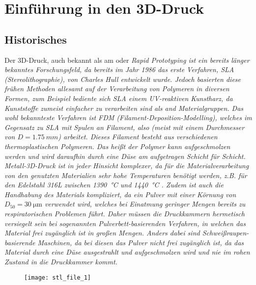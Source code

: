 \documentclass[../main.tex]{subfiles}
\begin{document}
\section{Einführung in den 3D-Druck}
\subsection{Historisches}
Der 3D-Druck, auch bekannt als \acrfull{am} oder \it{Rapid Prototyping} ist ein bereits länger bekanntes Forschungsfeld, da bereits im Jahr 1986 das erste Verfahren, SLA (Stereolithographie), von Charles Hull entwickelt wurde. 
Jedoch basierten diese frühen Methoden allesamt auf der Verarbeitung von Polymeren in diversen Formen, zum Beispiel bediente sich SLA einem UV-reaktiven Kunstharz, da Kunststoffe zumeist einfacher zu verarbeiten sind als and Materialgruppen. 
Das wohl bekannteste Verfahren ist FDM (\it{Filament-Deposition-Modelling}), welches im Gegensatz zu SLA mit Spulen an Filament, also  (meist mit einem Durchmesser von $D=\qty{1.75}{mm}$) arbeitet. 
Dieses Filament besteht aus verschiedenen thermoplastischen Polymeren. Das heißt der Polymer kann aufgeschmolzen werden und wird daraufhin durch eine Düse am  aufgetragen Schicht für Schicht.
Metall-3D-Druck ist in jeder Hinsicht komplexer, da für die Materialverarbeitung von den genutzten Materialien sehr hohe Temperaturen benötigt werden, z.B. für den Edelstahl 316L zwischen \qty{1390}{\celsius} und \qty{1440}{\degreeCelsius} \parencite{610LSTEEL}. Zudem ist auch die Handhabung des Materials kompliziert, da ein Pulver mit einer Körnung von $D_{50}=\SI{30}{\micro\meter}$\parencite[~S.3]{ZAKRZEWSKI2020115} verwendet wird, welches bei Einatmung geringer Mengen bereits zu respiratorischen Problemen führt.
Daher müssen die Druckkammern hermetisch versiegelt sein bei sogenannten Pulverbett-basierenden Verfahren, in welchen das Material frei zugänglich ist in großen Mengen.
Anders dabei sind Schweißraupen-basierende Maschinen, da bei diesen das Pulver nicht frei zugänglich ist, da das Material durch eine Düse ausgestrahlt und aufgeschmolzen wird und nie im rohen Zustand in die Druckkammer kommt.
\begin{figure}[h]
\begin{center}
	\texttt{[image: stl\_file\_1]}
	\label{img:stl_1}
\end{center}
\end{figure}	
\end{document}
